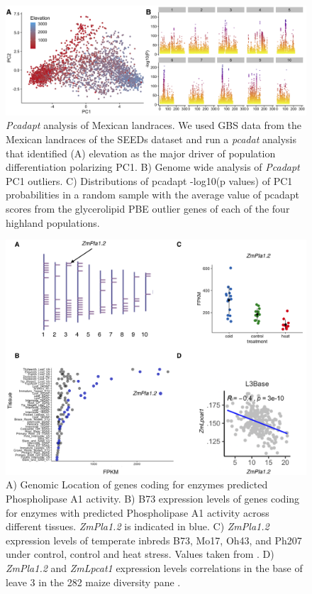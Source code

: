 \documentclass[9pt,twocolumn,twoside]{BioRxiv}
\begin{document}
\begin{figure}[t]
\begin{center}
\includegraphics[width=0.8\paperwidth]{Sup_Figures/Sup_Fig_2.png}
\caption{\textit{Pcadapt} analysis of Mexican landraces. We used GBS data from the Mexican landraces of the SEEDs dataset \citep{Romero_Navarro2017-cn} and run a \textit{pcadat} analysis \citep{Luu2017-ws} that identified (A) elevation as the major driver of population differentiation polarizing PC1.  
B) Genome wide analysis of \textit{Pcadapt} PC1 outliers. 
C) Distributions of pcadapt -log10(p values) of PC1 probabilities in a random sample with the average value of pcadapt scores from the glycerolipid PBE outlier genes of each of the four highland populations. 
}
\label{SupFig2}
\end{center}
\end{figure} 

\begin{figure}[t]
\begin{center}
\includegraphics[width=0.8\paperwidth]{Sup_Figures/Sup_Fig_3.png}
\caption{A) Genomic Location of genes coding for enzymes predicted Phospholipase A1 activity. B) B73 expression levels of genes coding for enzymes with predicted Phospholipase A1 activity across different tissues. \textit{ZmPla1.2} is indicated in blue. C) \textit{ZmPla1.2} expression levels of temperate inbreds B73, Mo17, Oh43, and Ph207 under control, control and heat stress. Values taken from \cite{Waters2017-nat}. D) \textit{ZmPla1.2} and \textit{ZmLpcat1} expression levels correlations in the base of leave 3 in the 282 maize diversity pane \cite{Kremling2018-gn}. 
}
\label{SupFig3}
\end{center}
\end{figure}  
\end{document}
